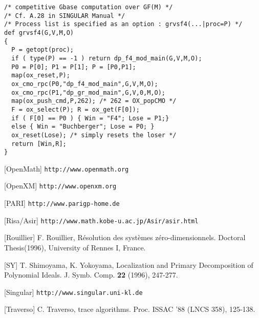 \begin{slide}{}

\begin{verbatim}
/* competitive Gbase computation over GF(M) */
/* Cf. A.28 in SINGULAR Manual */
/* Process list is specified as an option : grvsf4(...|proc=P) */
def grvsf4(G,V,M,O)
{
  P = getopt(proc);
  if ( type(P) == -1 ) return dp_f4_mod_main(G,V,M,O);
  P0 = P[0]; P1 = P[1]; P = [P0,P1];
  map(ox_reset,P);
  ox_cmo_rpc(P0,"dp_f4_mod_main",G,V,M,O);
  ox_cmo_rpc(P1,"dp_gr_mod_main",G,V,0,M,O);
  map(ox_push_cmd,P,262); /* 262 = OX_popCMO */
  F = ox_select(P); R = ox_get(F[0]);
  if ( F[0] == P0 ) { Win = "F4"; Lose = P1;}
  else { Win = "Buchberger"; Lose = P0; }
  ox_reset(Lose); /* simply resets the loser */
  return [Win,R];
}
\end{verbatim}
\end{slide}


\begin{slide}{}
[OpenMath] {\tt http://www.openmath.org}

[OpenXM] {\tt http://www.openxm.org}

[PARI] {\tt http://www.parigp-home.de}

[Risa/Asir] {\tt http://www.math.kobe-u.ac.jp/Asir/asir.html}

[Rouillier] F. Rouillier,
R\'esolution des syst\`emes z\'ero-dimensionnels. 
Doctoral Thesis(1996), University of Rennes I, France.

[SY] T. Shimoyama, K. Yokoyama, Localization and Primary Decomposition of Polynomial Ideals.  J. Symb. Comp. {\bf 22} (1996), 247-277.

[Singular] {\tt http://www.singular.uni-kl.de}

[Traverso] C. Traverso, \gr trace algorithms. Proc. ISSAC '88 (LNCS 358), 125-138.

\end{slide}
